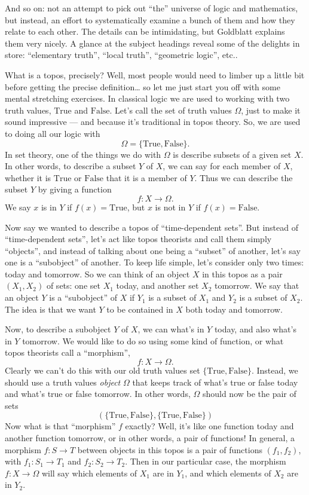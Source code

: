 \documentclass{article}
\begin{document}
And so on: not an attempt to pick out ``the'' universe of logic and
mathematics, but instead, an effort to systematically examine a bunch of
them and how they relate to each other. The details can be intimidating,
but Goldblatt explains them very nicely. A glance at the subject
headings reveal some of the delights in store: ``elementary truth'',
``local truth'', ``geometric logic'', etc..

What is a topos, precisely? Well, most people would need to limber up a
little bit before getting the precise definition\ldots{} so let me just
start you off with some mental stretching exercises. In classical logic
we are used to working with two truth values, \(\mathrm{True}\) and
\(\mathrm{False}\). Let's call the set of truth values \(\Omega\), just
to make it sound impressive --- and because it's traditional in topos
theory. So, we are used to doing all our logic with
\[\Omega = \{\mathrm{True}, \mathrm{False}\}.\] In set theory, one of
the things we do with \(\Omega\) is describe subsets of a given set
\(X\). In other words, to describe a subset \(Y\) of \(X\), we can say
for each member of \(X\), whether it is \(\mathrm{True}\) or
\(\mathrm{False}\) that it is a member of \(Y\). Thus we can describe
the subset \(Y\) by giving a function \[f\colon X \to \Omega.\] We say
\(x\) is in \(Y\) if \(f(x) = \mathrm{True}\), but \(x\) is not in \(Y\)
if \(f(x) = \mathrm{False}\).

Now say we wanted to describe a topos of ``time-dependent sets''. But
instead of ``time-dependent sets'', let's act like topos theorists and
call them simply ``objects'', and instead of talking about one being a
``subset'' of another, let's say one is a ``subobject'' of another. To
keep life simple, let's consider only two times: today and tomorrow. So
we can think of an object \(X\) in this topos as a pair \((X_1, X_2)\)
of sets: one set \(X_1\) today, and another set \(X_2\) tomorrow. We say
that an object \(Y\) is a ``subobject'' of \(X\) if \(Y_1\) is a subset
of \(X_1\) and \(Y_2\) is a subset of \(X_2\). The idea is that we want
\(Y\) to be contained in \(X\) both today and tomorrow.

Now, to describe a subobject \(Y\) of \(X\), we can what's in \(Y\)
today, and also what's in \(Y\) tomorrow. We would like to do so using
some kind of function, or what topos theorists call a ``morphism'',
\[f: X \to \Omega.\] Clearly we can't do this with our old truth values
set \(\{\mathrm{True},\mathrm{False}\}\). Instead, we should use a truth
values \emph{object} \(\Omega\) that keeps track of what's true or false
today and what's true or false tomorrow. In other words, \(\Omega\)
should now be the pair of sets
\[(\{\mathrm{True}, \mathrm{False}\}, \{\mathrm{True}, \mathrm{False}\})\]
Now what is that ``morphism'' \(f\) exactly? Well, it's like one
function today and another function tomorrow, or in other words, a pair
of functions! In general, a morphism \(f\colon S \to T\) between objects
in this topos is a pair of functions \((f_1,f_2)\), with
\(f_1\colon S_1 \to T_1\) and \(f_2\colon S_2 \to T_2\). Then in our
particular case, the morphism \(f\colon X \to \Omega\) will say which
elements of \(X_1\) are in \(Y_1\), and which elements of \(X_2\) are in
\(Y_2\).
\end{document}
